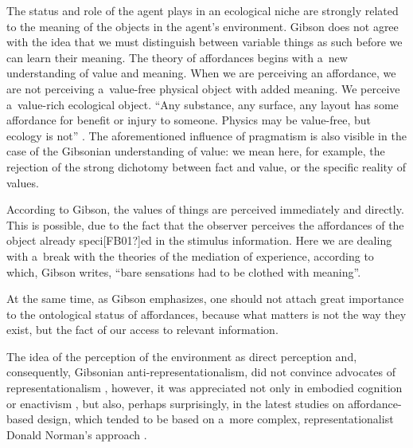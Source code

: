 The status and role of the agent plays in an ecological niche are strongly related to the meaning of the objects in the agent's environment. Gibson does not agree with the idea that we must distinguish between variable things as such before we can learn their meaning. The theory of affordances begins with a~new understanding of value and meaning. When we are perceiving an affordance, we are not perceiving a~value-free physical object with added meaning. We perceive a~value-rich ecological object. ``Any substance, any surface, any layout has some affordance for benefit or injury to someone. Physics may be value-free, but ecology is not'' 
\parencite[][p.140]{gibson_ecological_1979}. %
 The aforementioned influence of pragmatism is also visible in the case of the Gibsonian understanding of value: we mean here, for example, the rejection of the strong dichotomy between fact and value, or the specific reality of values.



According to Gibson, the values of things are perceived immediately and directly. This is possible, due to the fact that the observer perceives the affordances of the object already speci[FB01?]ed in the stimulus information. Here we are dealing with a~break with the theories of the mediation of experience, according to which, Gibson 
\parencite*[][p.140]{gibson_ecological_1979} %
 writes, ``bare sensations had to be clothed with meaning''.



At the same time, as Gibson emphasizes, one should not attach great importance to the ontological status of affordances, because what matters is not the way they exist, but the fact of our access to relevant information.



The idea of the perception of the environment as direct perception and, consequently, Gibsonian anti-representationalism, did not convince advocates of representationalism 
\parencite[e.g.,][]{fodor_how_1981}, %
 however, it was appreciated not only in embodied cognition or enactivism 
\parencite[][]{herasescribano_philosophy_2019}, %
 but also, perhaps surprisingly, in the latest studies on affordance-based design, which tended to be based on a~more complex, representationalist Donald Norman's approach 
\parencite[see][]{masoudi_review_2019}.%




